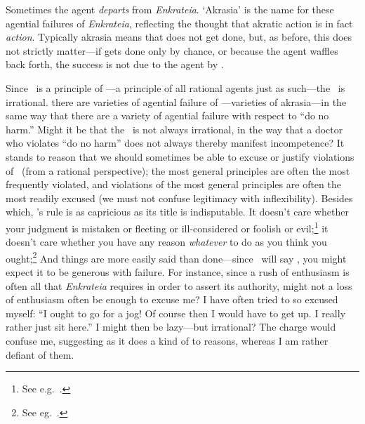 \documentclass[11pt,letterpaper,oneside]{amsart}
\begin{document}

Sometimes the agent \emph{departs} from \emph{Enkrateia}. `Akrasia' is the name for these agential failures of \emph{Enkrateia}, reflecting the thought that akratic action is in fact \emph{action}. Typically akrasia means that  does not get done, but, as before, this does not strictly matter---if  gets done only by chance, or because the agent waffles back  forth, the success is not due to the agent  by \enk.

Since \enk\ is a principle of ---\ie a principle of all rational agents just as such---the \ak\ is irrational.  there are varieties of agential failure of \enk---\ie varieties of akrasia---in the same way that there are a variety of agential failure with respect to ``do no harm.'' Might it be that the \ak\ is not always irrational, in the way that a doctor who violates ``do no harm'' does not always thereby manifest incompetence? It stands to reason that we should sometimes be able to excuse or justify violations of \enk\ (from a rational perspective); the most general principles are often the most frequently violated, and violations of the most general principles are often the most readily excused (we must not confuse legitimacy with inflexibility). Besides which, \enk's rule is as capricious as its title is indisputable. It doesn't care whether your judgment is mistaken or fleeting or ill-considered or foolish or evil;\footnote{See e.g.\ \cite{bennett1974conscience}.} it doesn't care whether you have any reason \emph{whatever} to do as you think you ought;\footnote{See eg.\ \citet{broome1999normative}.} And things are more easily said than done---since \enk\ will say , you might expect it to be generous with failure. For instance, since a rush of enthusiasm is often all that \emph{Enkrateia} requires in order to assert its authority, might not a loss of enthusiasm often be enough to excuse me? I have often tried to so excused myself: ``I ought to go for a jog! Of course then I would have to get up. I really rather just sit here.'' I might then be lazy---but irrational? The charge would confuse me, suggesting as it does a kind of  to reasons, whereas I am rather defiant of them.%
\end{document}
